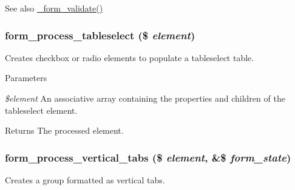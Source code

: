 \begin{DoxySeeAlso}{See also}
\hyperlink{group__form__api_ga464b4724506722d2a2d482df27736357}{\_\-form\_\-validate()} 
\end{DoxySeeAlso}
\hypertarget{group__form__api_ga4dc085d5191106b1a649c6df67feee30}{
\subsubsection[{form\_\-process\_\-tableselect}]{\setlength{\rightskip}{0pt plus 5cm}form\_\-process\_\-tableselect (\$ {\em element})}}
\label{group__form__api_ga4dc085d5191106b1a649c6df67feee30}
Creates checkbox or radio elements to populate a tableselect table.


\begin{DoxyParams}{Parameters}
\item[{\em \$element}]An associative array containing the properties and children of the tableselect element.\end{DoxyParams}
\begin{DoxyReturn}{Returns}
The processed element. 
\end{DoxyReturn}
\hypertarget{group__form__api_gaad2f405e02e146b5cfe75912a67964d6}{
\subsubsection[{form\_\-process\_\-vertical\_\-tabs}]{\setlength{\rightskip}{0pt plus 5cm}form\_\-process\_\-vertical\_\-tabs (\$ {\em element}, \/  \&\$ {\em form\_\-state})}}
\label{group__form__api_gaad2f405e02e146b5cfe75912a67964d6}
Creates a group formatted as vertical tabs.


